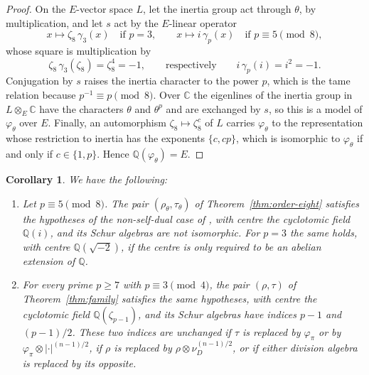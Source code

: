 \documentclass[a4paper,11pt]{amsart}
\newtheorem{corollary}[theorem]{Corollary}
\theoremstyle{definition}
\theoremstyle{remark}
\numberwithin{equation}{section}
\newcommand{\Q}{\mathbb{Q}}
\newcommand{\C}{\mathbb{C}}
\begin{document}
\begin{proof}
On the $E$-vector space $L$, let the inertia group act through $\theta$, by multiplication, and let $s$ act by the $E$-linear operator
\[
 x\mapsto\zeta_8\,\gamma_3(x)\quad\text{if }p=3,\qquad x\mapsto i\,\gamma_p(x)\quad\text{if }p\equiv5\pmod8,
\]
whose square is multiplication by
\[
 \zeta_8\,\gamma_3(\zeta_8)=\zeta_8^4=-1,\qquad\text{respectively}\qquad i\,\gamma_p(i)=i^2=-1.
\]
Conjugation by $s$ raises the inertia character to the power $p$, which is the tame relation because $p^{-1}\equiv p\pmod 8$. Over $\C$ the eigenlines of the inertia group in $L\otimes_E\C$ have the characters $\theta$ and $\theta^p$ and are exchanged by $s$, so this is a model of $\varphi_\theta$ over $E$. Finally, an automorphism $\zeta_8\mapsto\zeta_8^c$ of $L$ carries $\varphi_\theta$ to the representation whose restriction to inertia has the exponents $\{c,cp\}$, which is isomorphic to $\varphi_\theta$ if and only if $c\in\{1,p\}$. Hence $\Q(\varphi_\theta)=E$.
\end{proof}

\begin{corollary}\label{cor:pr-counterexamples}
We have the following:
\begin{enumerate}
\item[(i)] Let $p\equiv5\pmod8$. The pair $(\rho_\theta,\tau_\theta)$ of Theorem~\ref{thm:order-eight} satisfies the hypotheses of the non-self-dual case of \cite[Conjecture~6.1(1)]{PR12}, with centre the cyclotomic field $\Q(i)$, and its Schur algebras are not isomorphic. For $p=3$ the same holds, with centre $\Q(\sqrt{-2})$, if the centre is only required to be an abelian extension of $\Q$.
\item[(ii)] For every prime $p\ge7$ with $p\equiv3\pmod4$, the pair $(\rho,\tau)$ of Theorem~\ref{thm:family} satisfies the same hypotheses, with centre the cyclotomic field $\Q(\zeta_{p-1})$, and its Schur algebras have indices $p-1$ and $(p-1)/2$. These two indices are unchanged if $\tau$ is replaced by $\varphi_\pi$ or by $\varphi_\pi\otimes|\cdot|^{(n-1)/2}$, if $\rho$ is replaced by $\rho\otimes\nu_D^{(n-1)/2}$, or if either division algebra is replaced by its opposite.
\end{enumerate}
\end{corollary}
\end{document}
